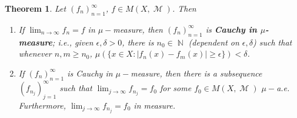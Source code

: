 \documentclass[12pt, a4paper]{memoir}
\DeclareMathOperator{\N}{{\mathbb{N}}}
\newtheorem{theorem}{Theorem}[section]
\theoremstyle{nonumberplain}
\DeclareMathOperator{\M}{\mathcal{M}}
\begin{document}
\begin{theorem}
    Let $(f_n)_{n=1}^\infty$, $f\in M(X,\M)$.
    Then
    \begin{enumerate}[nolistsep,label=(\roman*)]
        \item If $\lim_{n\to\infty}f_n=f$ in $\mu-$measure, then $(f_n)_{n=1}^\infty$ is \textbf{Cauchy in $\mu$-measure}; i.e., given $\epsilon,\delta>0$, there is $n_0\in\N$ (dependent on $\epsilon,\delta$) such that whenever $n,m\geq n_0$, $\mu(\{x\in X:|f_n(x)-f_m(x)|\geq\epsilon\})<\delta$.
        \item If $(f_n)_{n=1}^\infty$ is Cauchy in $\mu-$measure, then there is a subsequence $(f_{n_j})_{j=1}^\infty$ such that $\lim_{j\to\infty}f_{n_j}=f_0$ for some $f_0\in M(X,\M)$ $\mu-$a.e.
            Furthermore, $\lim_{j\to\infty}f_{n_j}=f_0$ in measure.
    \end{enumerate}
\end{theorem}
\end{document}
